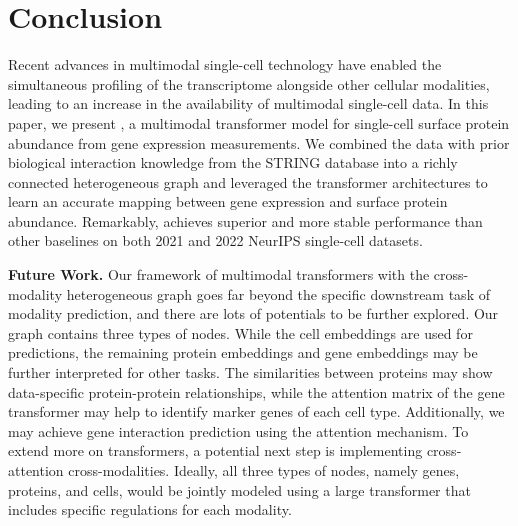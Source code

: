 \section{Conclusion}
Recent advances in multimodal single-cell technology have enabled the simultaneous profiling of the transcriptome alongside other cellular modalities, leading to an increase in the availability of multimodal single-cell data. In this paper, we present \method{}, a multimodal transformer model for single-cell surface protein abundance from gene expression measurements. We combined the data with prior biological interaction knowledge from the STRING database into a richly connected heterogeneous graph and leveraged the transformer architectures to learn an accurate mapping between gene expression and surface protein abundance. Remarkably, \method{} achieves superior and more stable performance than other baselines on both 2021 and 2022 NeurIPS single-cell datasets.

\noindent\textbf{Future Work.}
Our framework of multimodal transformers with the cross-modality heterogeneous graph goes far beyond the specific downstream task of modality prediction, and there are lots of potentials to be further explored. Our graph contains three types of nodes. While the cell embeddings are used for predictions, the remaining protein embeddings and gene embeddings may be further interpreted for other tasks. The similarities between proteins may show data-specific protein-protein relationships, while the attention matrix of the gene transformer may help to identify marker genes of each cell type. Additionally, we may achieve gene interaction prediction using the attention mechanism.
To extend more on transformers, a potential next step is implementing cross-attention cross-modalities. Ideally, all three types of nodes, namely genes, proteins, and cells, would be jointly modeled using a large transformer that includes specific regulations for each modality. 



